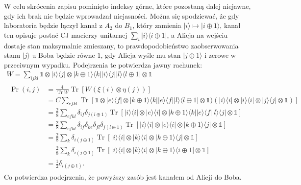 \documentclass[10pt]{article} %
\DeclareMathOperator{\Trs}{Tr}
\newcommand{\Ket}[1]{|#1\rangle}
\newcommand{\Bra}[1]{\langle#1|}
\newcommand{\I}{\mathbb{1}}
\begin{document}
W celu skrócenia zapisu pominięto indeksy górne, które pozostaną dalej niejawne, gdy ich brak nie będzie wprowadzał niejasności.
Można się spodziewać, że gdy laboratoria będzie łączył kanał z $A_2$ do $B_1$, który zamienia $\Ket{i} \mapsto \Ket{i \oplus 1}$, kanał ten opisuje postać CJ macierzy unitarnej $\sum_i \Ket{i}\Bra{i \oplus 1}$, a Alicja na wejściu dostaje stan maksymalnie zmieszany, to prawdopodobieństwo
zaobserwowania stanu $\Ket{j}$ u Boba będzie równe $1$, gdy Alicja wyśle mu stan $\Ket{j \oplus 1}$ i zerowe w przeciwnym wypadku. Podejrzenia te potwierdza jawny rachunek:
\begin{gather}
W = \sum_{ijkl} \I \otimes \Ket{i}\Bra{j} \otimes \Ket{k\oplus 1}\Bra{k} \Ket{i}\Bra{j} \Ket{l}\Bra{l \oplus 1} \otimes \I \\
\begin{split}
\Pr(i,j) &= \frac{4}{\Trs W} \Trs\left[ W (\xi(i) \otimes \eta(j))\right]\\&=C \sum_{efkl} \Trs [\I \otimes \Ket{e}\Bra{f} \otimes \Ket{k\oplus 1}\Bra{k} \Ket{e}\Bra{f} \Ket{l}\Bra{l \oplus 1} \otimes \I)(\Ket{i}\Bra{i} \otimes \Ket{i}\Bra{i} \otimes \Ket{j}\Bra{j} \otimes \I)] \\
&= \frac{2}{8} \sum_{efkl} \delta_{if} \delta_{j(l \oplus 1)} \Trs \left[ \Ket{i}\Bra{i} \otimes \Ket{e}\Bra{i} \otimes \Ket{k \oplus 1}\Bra{k}\Ket{e}\Bra{f}\Ket{l}\Bra{j} \otimes \I \right] \\
&= \frac{2}{8} \sum_{efkl} \delta_{if} \delta_{ke} \delta_{fl} \delta_{j(l \oplus 1)} \Trs \left[ \Ket{i}\Bra{i} \otimes \Ket{e}\Bra{i} \otimes \Ket{k \oplus 1} \Bra{j} \otimes \I\right] \\
&= \frac{2}{8} \sum_{k} \delta_{i(j \oplus 1)} \Trs \left[ \Ket{i}\Bra{i} \otimes \Ket{k}\Bra{i} \otimes \Ket{k \oplus 1}\Bra{j} \otimes \I \right]  \\
&= \frac{2}{8} \sum_k \delta_{i(j \oplus 1)} \Trs \left[ \Ket{i}\Bra{i} \otimes \Ket{k}\Bra{i} \otimes \Ket{k \oplus 1}\Bra{i \oplus 1} \otimes  \I\right] \\
&=  \frac{1}{2} \delta_{i(j \oplus 1)}.
\end{split} 
\end{gather}  Co potwierdza podejrzenia, że powyższy zasób jest kanałem od Alicji do Boba.
\end{document}

